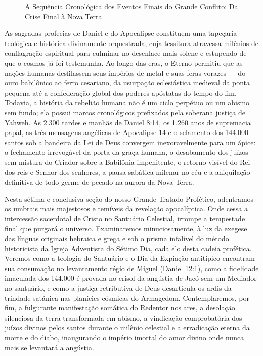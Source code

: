 \documentclass[11pt,a4paper,openany]{book}
\begin{document}
\begin{figure}[htbp]
{
}
\caption{A Sequência Cronológica dos Eventos Finais do Grande Conflito: Da Crise Final à Nova Terra.}
\label{fig:escatologia_final}
\end{figure}






As sagradas profecias de Daniel e do Apocalipse constituem uma tapeçaria teológica e histórica divinamente orquestrada, cuja tessitura atravessa milênios de conflagração espiritual para culminar no desenlace mais solene e estupendo de que o cosmos já foi testemunha. Ao longo das eras, o Eterno permitiu que as nações humanas desfilassem seus impérios de metal e suas feras vorazes — do ouro babilônico ao ferro cesariano, da usurpação eclesiástica medieval da ponta pequena até a confederação global dos poderes apóstatas do tempo do fim. Todavia, a história da rebelião humana não é um ciclo perpétuo ou um abismo sem fundo; ela possui marcos cronológicos prefixados pela soberana justiça de Yahweh. As 2.300 tardes e manhãs de Daniel 8:14, os 1.260 anos de supremacia papal, as três mensagens angélicas de Apocalipse 14 e o selamento dos 144.000 santos sob a bandeira da Lei de Deus convergem inexoravelmente para um ápice: o fechamento irrevogável da porta da graça humana, o desabamento dos juízos sem mistura do Criador sobre a Babilônia impenitente, o retorno visível do Rei dos reis e Senhor dos senhores, a pausa sabática milenar no céu e a aniquilação definitiva de todo germe de pecado na aurora da Nova Terra.

Nesta sétima e conclusiva seção do nosso Grande Tratado Profético, adentramos os umbrais mais majestosos e temíveis da revelação apocalíptica. Onde cessa a intercessão sacerdotal de Cristo no Santuário Celestial, irrompe a tempestade final que purgará o universo. Examinaremos minuciosamente, à luz da exegese das línguas originais hebraica e grega e sob o prisma infalível do método historicista da Igreja Adventista do Sétimo Dia, cada elo desta cadeia profética. Veremos como a teologia do Santuário e o Dia da Expiação antitípico encontram sua consumação no levantamento régio de Miguel (Daniel 12:1), como a fidelidade imaculada dos 144.000 é provada no crisol da angústia de Jacó sem um Mediador no santuário, e como a justiça retributiva de Deus desarticula os ardis da trindade satânica nas planícies cósmicas do Armagedom. Contemplaremos, por fim, a fulgurante manifestação somática do Redentor nos ares, a desolação silenciosa da terra transformada em abismo, a vindicação comprobatória dos juízos divinos pelos santos durante o milênio celestial e a erradicação eterna da morte e do diabo, inaugurando o império imortal do amor divino onde nunca mais se levantará a angústia.
\end{document}
